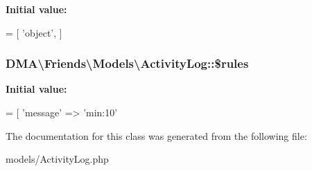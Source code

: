 {\bfseries Initial value\+:}
\begin{DoxyCode}
= [
        \textcolor{stringliteral}{'object'},
    ]
\end{DoxyCode}
\hypertarget{classDMA_1_1Friends_1_1Models_1_1ActivityLog_a0b8a60f69fd1fef78f71d538ca6f12e0}{
\subsubsection[{\$rules}]{\setlength{\rightskip}{0pt plus 5cm}D\+M\+A\textbackslash{}\+Friends\textbackslash{}\+Models\textbackslash{}\+Activity\+Log\+::\$rules\hspace{0.3cm}{\ttfamily [protected]}}}\label{classDMA_1_1Friends_1_1Models_1_1ActivityLog_a0b8a60f69fd1fef78f71d538ca6f12e0}
{\bfseries Initial value\+:}
\begin{DoxyCode}
= [
        \textcolor{stringliteral}{'message'}       => \textcolor{stringliteral}{'min:10'}
\end{DoxyCode}


The documentation for this class was generated from the following file\+:\begin{DoxyCompactItemize}
\item 
models/Activity\+Log.\+php\end{DoxyCompactItemize}
